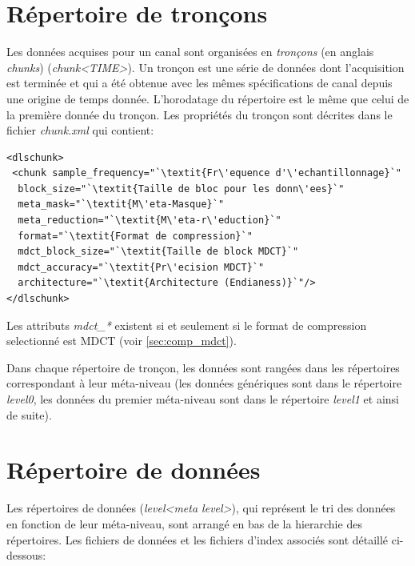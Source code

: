 \documentclass[a4paper,12pt,BCOR6mm,bibtotoc,idxtotoc]{scrbook}
\begin{document}

\section{R\'epertoire de tron\c cons}
\label{sec:data_chunks}

Les donn\'ees acquises pour un canal sont organis\'ees en
\textit{tron\c cons} (en anglais \textit{chunks})
(\textit{chunk\textless TIME\textgreater}). Un tron\c con
est une s\'erie de donn\'ees dont l'acquisition est termin\'ee
et qui a \'et\'e obtenue avec les m\^emes sp\'ecifications de canal
depuis une origine de temps donn\'ee.
L'horodatage du r\'epertoire est le m\^eme que celui de la premi\`ere donn\'ee
du tron\c con.
Les propri\'et\'es du tron\c con sont d\'ecrites dans le fichier
\textit{chunk.xml} qui contient:

\begin{lstlisting}
<dlschunk>
 <chunk sample_frequency="`\textit{Fr\'equence d'\'echantillonnage}`"
  block_size="`\textit{Taille de bloc pour les donn\'ees}`"
  meta_mask="`\textit{M\'eta-Masque}`"
  meta_reduction="`\textit{M\'eta-r\'eduction}`"
  format="`\textit{Format de compression}`"
  mdct_block_size="`\textit{Taille de block MDCT}`"
  mdct_accuracy="`\textit{Pr\'ecision MDCT}`"
  architecture="`\textit{Architecture (Endianess)}`"/>
</dlschunk>
\end{lstlisting}

Les attributs \textit{mdct\_*} existent si et seulement si
le format de compression selectionn\'e est MDCT (voir \autoref{sec:comp_mdct}).

Dans chaque r\'epertoire de tron\c con, les donn\'ees sont rang\'ees
dans les r\'epertoires correspondant \`a leur m\'eta-niveau
(les donn\'ees g\'en\'eriques sont dans le r\'epertoire \textit{level0},
les donn\'ees du premier m\'eta-niveau sont dans le r\'epertoire \textit{level1}
et ainsi de suite).


\section{R\'epertoire de donn\'ees}
\label{sec:data_data}

Les r\'epertoires de donn\'ees (\textit{level\textless meta
  level\textgreater}), qui repr\'esent le tri des donn\'ees en
fonction de leur m\'eta-niveau, sont arrang\'e en bas de la hierarchie
des r\'epertoires.  Les fichiers de donn\'ees et les fichiers d'index
associ\'es sont d\'etaill\'e ci-dessous:
\end{document}
